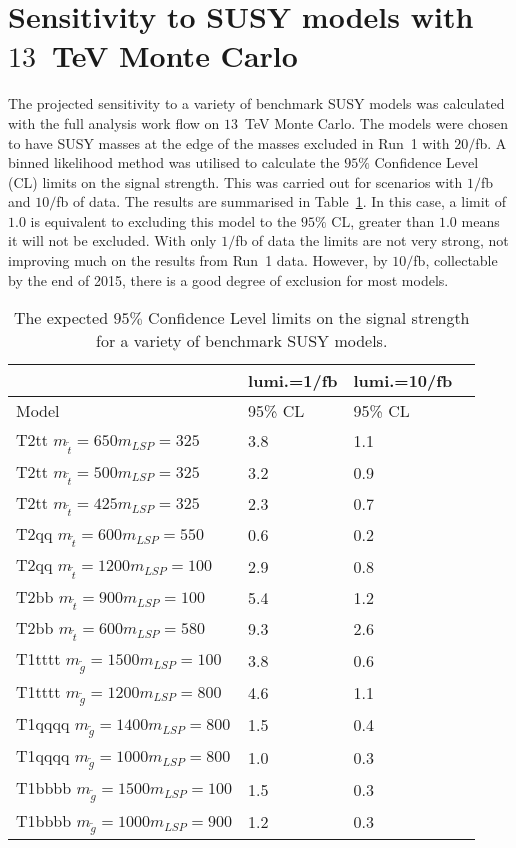 
\section{Sensitivity to SUSY models with $13$~TeV Monte Carlo}
\label{sec:phys14Results}

The projected sensitivity to a variety of benchmark SUSY models was calculated with the full analysis work flow on $13$~TeV Monte Carlo. The models were chosen to have SUSY masses at the edge of the masses excluded in Run~1 with $20/$fb. A binned likelihood method was utilised to calculate the $95\%$ Confidence Level (CL) limits on the signal strength. This was carried out for scenarios with $1/$fb and $10/$fb of data. The results are summarised in Table~\ref{tab:results}. In this case, a limit of $1.0$ is equivalent to excluding this model to the $95\%$ CL, greater than $1.0$ means it will not be excluded. With only $1/$fb of data the limits are not very strong, not improving much on the results from Run~1 data. However, by $10/$fb, collectable by the end of 2015, there is a good degree of exclusion for most models.
 
\begin{table}[h]
\caption{The expected $95\%$ Confidence Level limits on the signal strength for a variety of benchmark SUSY models. \label{tab:results}}
\centering 
\begin{tabular}{ | l | l | l | }
\hline
	&lumi.=1/fb & lumi.=10/fb  \  \\ \hline
	Model & 95\% CL & 95\% CL \\ \hline
	T2tt $m_{\tilde{t}}=650 m_{LSP}=325$ & 3.8 & 1.1 \\ 
	T2tt $m_{\tilde{t}}=500 m_{LSP}=325$ & 3.2 & 0.9 \\ 
	T2tt $m_{\tilde{t}}=425 m_{LSP}=325$ & 2.3 & 0.7 \\ 
	T2qq $m_{\tilde{t}}=600 m_{LSP}=550$ & 0.6 & 0.2 \\ 
	T2qq $m_{\tilde{t}}=1200 m_{LSP}=100$ & 2.9 & 0.8 \\ 
	T2bb $m_{\tilde{t}}=900 m_{LSP}=100$ & 5.4 & 1.2 \\ 
	T2bb $m_{\tilde{t}}=600 m_{LSP}=580$ & 9.3 & 2.6 \\ 
	T1tttt $m_{\tilde{g}}=1500 m_{LSP}=100$ & 3.8 & 0.6 \\ 
	T1tttt $m_{\tilde{g}}=1200 m_{LSP}=800$ & 4.6 & 1.1 \\ 
	T1qqqq $m_{\tilde{g}}=1400 m_{LSP}=800$ & 1.5 & 0.4 \\ 
	T1qqqq $m_{\tilde{g}}=1000 m_{LSP}=800$ & 1.0 & 0.3 \\ 
	T1bbbb $m_{\tilde{g}}=1500 m_{LSP}=100$ & 1.5 & 0.3 \\ 
	T1bbbb $m_{\tilde{g}}=1000 m_{LSP}=900$ & 1.2 & 0.3 \\ \hline
\end{tabular}
\end{table}